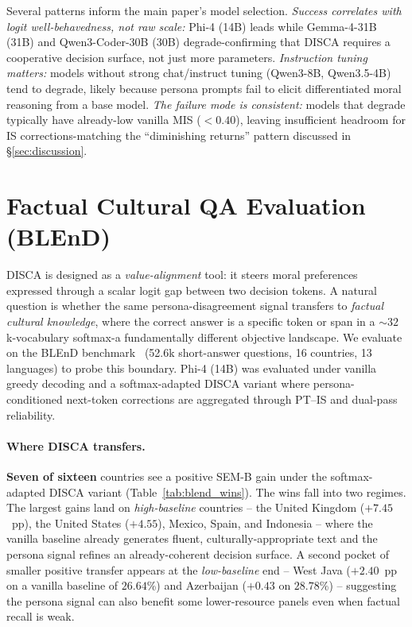 \documentclass{article}
\begin{document}
Several patterns inform the main paper's model selection.
\emph{Success correlates with logit well-behavedness, not raw scale:} Phi-4 (14B) leads while Gemma-4-31B (31B) and Qwen3-Coder-30B (30B) degrade-confirming that DISCA requires a cooperative decision surface, not just more parameters. \emph{Instruction tuning matters:} models without strong chat/instruct tuning (Qwen3-8B, Qwen3.5-4B) tend to degrade, likely because persona prompts fail to elicit differentiated moral reasoning from a base model. \emph{The failure mode is consistent:} models that degrade typically have already-low vanilla MIS ($<0.40$), leaving insufficient headroom for IS
corrections-matching the ``diminishing returns'' pattern discussed in
\S\ref{sec:discussion}.

\section{Factual Cultural QA Evaluation (BLEnD)}
\label{app:blend}

DISCA is designed as a \emph{value-alignment} tool: it steers moral preferences expressed through a scalar logit gap between two decision tokens. A natural question is whether the same persona-disagreement signal transfers to \emph{factual cultural knowledge}, where the correct answer is a specific token or span in a ${\sim}\!32$k-vocabulary softmax-a fundamentally different objective landscape. We evaluate on the BLEnD benchmark~\citep{myung2024blend} (52.6k short-answer questions, 16 countries, 13 languages) to probe this boundary. Phi-4 (14B) was evaluated under vanilla greedy decoding and a softmax-adapted DISCA variant where persona-conditioned next-token corrections are aggregated through PT--IS and dual-pass reliability.

\paragraph{Where DISCA transfers.}
\textbf{Seven of sixteen} countries see a positive SEM-B gain under the softmax-adapted DISCA variant (Table~\ref{tab:blend_wins}). The wins fall into two regimes. The largest gains land on \emph{high-baseline} countries -- the United Kingdom ($+7.45$~pp), the United States ($+4.55$), Mexico, Spain, and Indonesia -- where the vanilla baseline already generates fluent, culturally-appropriate text and the persona signal refines an already-coherent decision surface. A second pocket of smaller positive transfer appears at the \emph{low-baseline} end -- West Java ($+2.40$~pp on a vanilla baseline of $26.64$\%) and Azerbaijan ($+0.43$ on $28.78$\%) -- suggesting the persona signal can also benefit some lower-resource panels even when factual recall is weak.
\end{document}
